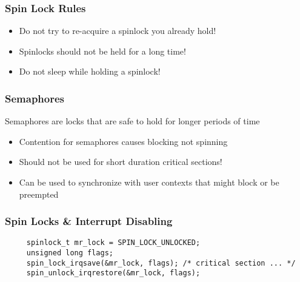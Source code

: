 \begin{frame}[fragile]
    \frametitle{Spin Lock Rules}
    \Large
        \begin{itemize}
        \item Do not try to re-acquire a spinlock you already hold!
        \item Spinlocks should not be held for a long time!
        \item Do not sleep while holding a spinlock!
        
    \end{itemize}

    
\end{frame}


\begin{frame}[fragile]
    \frametitle{Semaphores}
    \Large
    Semaphores are locks that are safe to hold for
    longer periods of time
    \large
    \begin{itemize}
        \item Contention for semaphores causes blocking not spinning
        \item Should not be used for short duration critical sections!
        \item Can be used to synchronize with user contexts that
        might block or be preempted
     \end{itemize}  
\end{frame} 
 
 \begin{frame}[fragile]
 \frametitle{Spin Locks \& Interrupt Disabling}
 \large    
 \begin{block}{}
     \begin{verbatim}
     spinlock_t mr_lock = SPIN_LOCK_UNLOCKED;
     unsigned long flags;
     spin_lock_irqsave(&mr_lock, flags); /* critical section ... */
     spin_unlock_irqrestore(&mr_lock, flags);
     \end{verbatim}
 \end{block} 
\end{frame}

